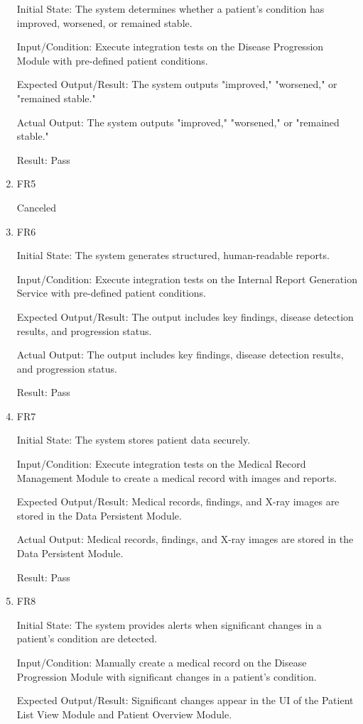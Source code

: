 \documentclass[12pt, titlepage]{article}
\begin{document}
\begin{enumerate}
Initial State: The system determines whether a patient's condition has improved, worsened, or remained stable.

Input/Condition: Execute integration tests on the Disease Progression Module with pre-defined patient conditions.

Expected Output/Result: The system outputs "improved," "worsened," or "remained stable."

Actual Output: The system outputs "improved," "worsened," or "remained stable."

Result: Pass

\item{FR5}

Canceled

\item{FR6}

Initial State: The system generates structured, human-readable reports.

Input/Condition: Execute integration tests on the Internal Report Generation Service with pre-defined patient conditions.

Expected Output/Result: The output includes key findings, disease detection results, and progression status.

Actual Output: The output includes key findings, disease detection results, and progression status.

Result: Pass

\item{FR7}

Initial State: The system stores patient data securely.

Input/Condition: Execute integration tests on the Medical Record Management Module to create a medical record with images and reports.

Expected Output/Result: Medical records, findings, and X-ray images are stored in the Data Persistent Module.

Actual Output: Medical records, findings, and X-ray images are stored in the Data Persistent Module.

Result: Pass

\item{FR8}

Initial State: The system provides alerts when significant changes in a patient’s condition are detected.

Input/Condition: Manually create a medical record on the Disease Progression Module with significant changes in a patient’s condition.

Expected Output/Result: Significant changes appear in the UI of the Patient List View Module and Patient Overview Module.


\end{enumerate}
\end{document}
